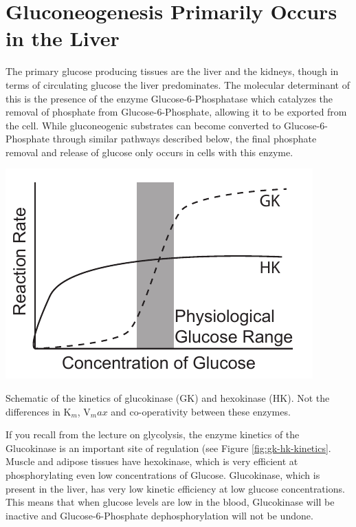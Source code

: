\documentclass{tufte-handout}
\begin{document}
\section{Gluconeogenesis Primarily Occurs in the Liver}

The primary glucose producing tissues are the liver and the kidneys, though in terms of circulating glucose the liver predominates.  The molecular determinant of this is the presence of the enzyme Glucose-6-Phosphatase which catalyzes the removal of phosphate from Glucose-6-Phosphate, allowing it to be exported from the cell.  While gluconeogenic substrates can become converted to Glucose-6-Phosphate through similar pathways described below, the final phosphate removal and release of glucose only occurs in cells with this enzyme.

\begin{marginfigure}
\includegraphics{figures/gk-hk-kinetics.pdf}
\caption{Schematic of the kinetics of glucokinase (GK) and hexokinase (HK).  Not the differences in K$_m$, V$_max$ and co-operativity between these enzymes.}
\label{fig:gk-hk-kinetics}
\end{marginfigure}

  If you recall from the lecture on glycolysis, the enzyme kinetics of the Glucokinase is an important site of regulation (see Figure \ref{fig:gk-hk-kinetics}.  Muscle and adipose tissues have hexokinase, which is very efficient at phosphorylating even low concentrations of Glucose. Glucokinase, which is present in the liver, has very low kinetic efficiency at low glucose concentrations.  This means that when glucose levels are low in the blood, Glucokinase will be inactive and Glucose-6-Phosphate dephosphorylation will not be undone.
\end{document}
